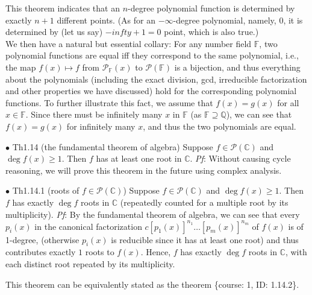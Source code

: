 \documentclass{article}
\begin{document}
\begin{Rmk}{}
    This theorem indicates that an $n$-degree polynomial function is determined by exactly $n+1$ different points. (As for an $-\infty$-degree polynomial, namely, $0$, it is determined by (let us say) $-infty+1=0$ point, which is also true.) \\ 
    We then have a natural but essential collary: \textcolor{Th}{For any number field $\mathbb{F}$, two polynomial functions are equal iff they correspond to the same polynomial,} i.e., the map $f(x)\mapsto f$ from $\mathcal{P}_\mathbb{F}(x)$ to $\mathcal{P}(\mathbb{F})$ is a bijection, and thus everything about the polynomials (including the exact division, gcd, irreducible factorization and other properties we have discussed) hold for the corresponding polynomial functions. To further illustrate this fact, we assume that $f(x) = g(x)$ for all $x\in\mathbb{F}$. Since there must be infinitely many $x$ in $\mathbb{F}$ (as $\mathbb{F}\supseteq\mathbb{Q}$), we can see that $f(x) = g(x)$ for infinitely many $x$, and thus the two polynomials are equal.
\end{Rmk}

\begin{Th}{$\bullet$ Th1.14 (the fundamental theorem of algebra)}
    Suppose $f\in\mathcal{P}(\mathbb{C})$ and $\deg f(x)\geq 1$. Then $f$ has at least one root in $\mathbb{C}$.
    \tcblower
    \textit{Pf}: Without causing cycle reasoning, we will prove this theorem in the future using complex analysis.
\end{Th}

\begin{Th}{$\bullet$ Th1.14.1 (roots of $f\in\mathcal{P}(\mathbb{C})$)}
    Suppose $f\in\mathcal{P}(\mathbb{C})$ and $\deg f(x)\geq 1$. Then $f$ has exactly $\deg f$ roots in $\mathbb{C}$ (repeatedly counted for a multiple root by its multiplicity).
    \tcblower
    \textit{Pf}: By the fundamental theorem of algebra, we can see that every $p_i(x)$ in the canonical factorization $c[p_1(x)]^{n_1}\dots[p_m(x)]^{n_m}$ of $f(x)$ is of 1-degree, (otherwise $p_i(x)$ is reducible since it has at least one root) and thus contributes exactly $1$ roots to $f(x)$. Hence, $f$ has exactly $\deg f$ roots in $\mathbb{C}$, with each distinct root repeated by its multiplicity. 
\end{Th}

\begin{Rmk}{}
    This theorem can be equivalently stated as the theorem \{course: 1, ID: 1.14.2\}.
\end{Rmk}
\end{document}
